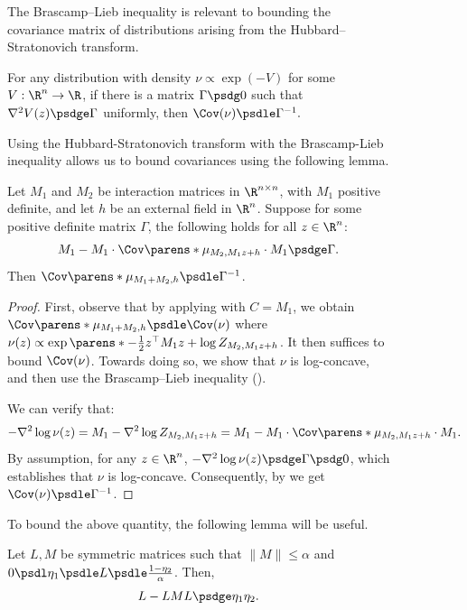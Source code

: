 \documentclass[11pt,letterpaper]{article}
\begin{document}
\begin{figure}
    The Brascamp--Lieb inequality is relevant to bounding the covariance matrix of distributions arising from the Hubbard--Stratonovich transform.
    \begin{theorem} \label{thm:brascamp-lieb}
        For any distribution with density $\nu\propto\exp(-V)$ for some $V:\R^n\to\R$, if there is a matrix $\Gamma\psdg 0$ such that $\nabla^2 V(z)\psdge\Gamma$ uniformly, then
        \(
            \Cov(\nu) \psdle \Gamma^{-1}.
        \)
    \end{theorem}

    Using the Hubbard-Stratonovich transform with the Brascamp-Lieb inequality allows us to bound covariances using the following lemma.

    \begin{lemma}   \label{lem:interaction-sum-cov-bound}
        Let $M_1$ and $M_2$ be interaction matrices in $\R^{n\times n}$, with $M_1$ positive definite, and let $h$ be an external field in $\R^n$.
        Suppose for some positive definite matrix $\Gamma$, the following holds for all $z\in\R^n$:
        \[
            M_1 - M_1\cdot \Cov\parens*{\mu_{M_2, M_1z + h}} \cdot M_1 \psdge \Gamma.
        \]
        Then $\Cov\parens*{\mu_{M_1+M_2, h}} \psdle \Gamma^{-1}$.
    \end{lemma}
    \begin{proof}
        First, observe that by applying  with $C = M_1$, we obtain $\Cov\parens*{\mu_{M_1+M_2, h}} \psdle \Cov(\nu)$ where $\nu(z)\propto\exp\parens*{-\frac{1}{2}z^{\top}M_1z + \log Z_{M_2, M_1 z + h}}$.
        It then suffices to bound $\Cov(\nu)$.
        Towards doing so, we show that $\nu$ is log-concave, and then use the Brascamp--Lieb inequality ().
    
        We can verify that:
        \[
            -\nabla^2\log\nu(z) = M_1 - \nabla^2 \log Z_{M_2, M_1z + h} = M_1 - M_1\cdot \Cov\parens*{\mu_{M_2, M_1z+h}} \cdot M_1.
        \]
        By assumption, for any $z\in\R^n$, $-\nabla^2\log\nu(z) \psdge \Gamma\psdg 0$, which establishes that $\nu$ is log-concave.
        Consequently, by  we get $\Cov(\nu)\psdle\Gamma^{-1}$.
    \end{proof}

    To bound the above quantity, the following lemma will be useful.
    
    \begin{fact}
        \label{prop:prop-hs-trick}
        Let $L,M$ be symmetric matrices such that $\|M\| \le \alpha$ and $0 \psdl \eta_1 \psdle L \psdle \frac{1-\eta_2}{\alpha}$. Then,
        \[ L - LML \psdge \eta_1\eta_2. \]
    \end{fact}


\end{figure}
\end{document}
